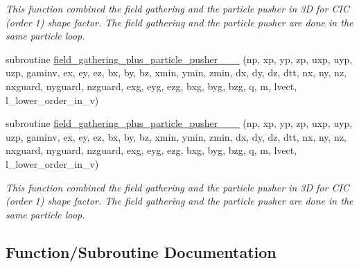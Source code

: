 \begin{DoxyCompactItemize}
\begin{DoxyCompactList}\small\item\em This function combined the field gathering and the particle pusher in 3D for C\+IC (order 1) shape factor. The field gathering and the particle pusher are done in the same particle loop. \end{DoxyCompactList}\item 
subroutine \hyperlink{particles__push_8_f90_ac04a46dfecd1ade015d3bf1ff801159a}{field\+\_\+gathering\+\_\+plus\+\_\+particle\+\_\+pusher\+\_\+\_\+\_} (np, xp, yp, zp, uxp, uyp, uzp, gaminv,                                                                                                                                                   ex, ey, ez, bx, by, bz, xmin, ymin, zmin,                                                                                                                                                           dx, dy, dz, dtt, nx, ny, nz, nxguard, nyguard, nzguard,                                                                                                                                                   exg, eyg, ezg, bxg, byg, bzg, q, m, lvect, l\+\_\+lower\+\_\+order\+\_\+in\+\_\+v)
\item 
subroutine \hyperlink{particles__push_8_f90_a87ad05cb46ac948188f2738ca82ab6a3}{field\+\_\+gathering\+\_\+plus\+\_\+particle\+\_\+pusher\+\_\+\_\+\_} (np, xp, yp, zp, uxp, uyp, uzp, gaminv,                                                                                                                                                   ex, ey, ez, bx, by, bz, xmin, ymin, zmin,                                                                                                                                                           dx, dy, dz, dtt, nx, ny, nz, nxguard, nyguard, nzguard,                                                                                                                                                   exg, eyg, ezg, bxg, byg, bzg, q, m, lvect, l\+\_\+lower\+\_\+order\+\_\+in\+\_\+v)
\begin{DoxyCompactList}\small\item\em This function combined the field gathering and the particle pusher in 3D for C\+IC (order 1) shape factor. The field gathering and the particle pusher are done in the same particle loop. \end{DoxyCompactList}\end{DoxyCompactItemize}


\subsection{Function/\+Subroutine Documentation}
